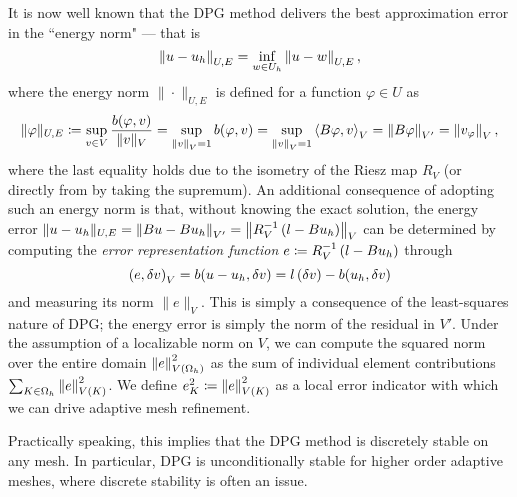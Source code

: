 It is now well known that the DPG method delivers the best approximation error in the ``energy norm" --- that is \cite{Bui-ThanhDemkowiczGhattas11a, DPG2,DPG4} 
\begin{equation}
\eqnlab{optimalError}
\nor{u-u_h}_{U,E} = \inf_{w\in U_h} \nor{u-w}_{U,E},
\end{equation}
where the energy norm $\|\cdot \|_{U,E}$ is defined for a function $\varphi \in U$ as
\begin{equation}
\eqnlab{energyNorm} \|\varphi\|_{U,E} \coloneqq \sup_{v\in V}
\frac{b(\varphi,v)}{\|v\|_V} = \sup_{\nor{v}_V = 1} b(\varphi,v) =
\sup_{\nor{v}_V = 1} \LRa{B\varphi,v}_V = \nor{B\varphi}_{V'} =
\nor{v_\varphi}_V,
\end{equation}
where the last equality holds due to the isometry of the Riesz map
$R_V$ (or directly from  by taking the supremum). An
additional consequence of adopting such an energy norm is that,
without knowing the exact solution, the energy error $\|u-u_h\|_{U,E}  = \nor{Bu - Bu_h}_{V'} = \nor{R_V^{-1}\LRp{l-Bu_h}}_{V}$ can
be determined by computing the \textit{error representation function} $e \coloneqq R_V^{-1}\LRp{l-Bu_h}$ through
\[
\left(e,\delta v\right)_V = b(u-u_h,\delta v) = l\LRp{\delta v} - b(u_h,\delta v)
\]
and measuring its norm $\|e\|_V$.  This is simply a consequence of the least-squares nature of DPG; the energy error is simply the norm of the residual in $V'$.  Under the assumption of a localizable norm on $V$, we can compute the squared norm over the entire domain $\nor{e}_{V(\Oh)}^2$ as the sum of individual element contributions $\sum_{K\in \Oh} \nor{e}_{V(K)}^2$.  We define $e_K^2 \coloneqq \nor{e}_{V(K)}^2$ as a local error indicator with which we can drive adaptive mesh refinement.  

Practically speaking, this implies that the DPG method is discretely stable on any mesh. In particular, DPG is unconditionally stable for higher order adaptive meshes, where discrete stability is often an issue. 

